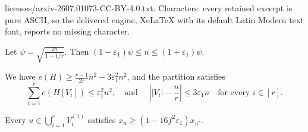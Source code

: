 \documentclass[10pt,a4paper]{amsart}
\newcommand{\eps}{\varepsilon}
\renewcommand{\ge}{\geqslant}
\renewcommand{\le}{\leqslant}
\begin{document}
licenses/arxiv-2607.01073-CC-BY-4.0.txt. Characters: every retained excerpt is pure ASCII, so the delivered engine, XeLaTeX with its default Latin Modern text font, reports no missing character.
\begin{claim}\label{clm:n-size}
Let $ \psi=\sqrt{\frac{2h}{1-1/r}}$. Then 
$ (1-\eps_1)\psi\le n\le (1+\eps_1)\psi.$
\end{claim}

\begin{claim}\label{clm:balanced-partition}
We have $  e(H)\ge \frac{r-1}{2r}n^2-3\eps_1^2n^2$, and 
the partition satisfies
\[
  \sum_{i=1}^r e(H[V_i])\le \eps_1^2n^2, \quad \text{and~} \quad 
    \left||V_i|-\frac nr\right|\le 3\eps_1n
  \quad
  \text{for every }i\in[r]. 
\]
\end{claim}

\begin{claim}\label{clm:perron-almost-constant}
Every $u\in\bigcup_{i=1}^r V_i^{(1)}$ satisfies
$x_u\ge(1-16f^2\eps_1)x_{u^\ast}$.
\end{claim}
\end{document}

